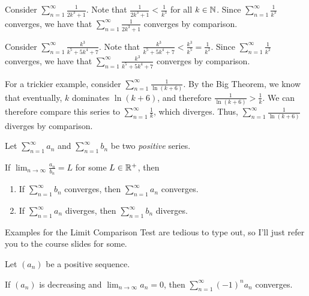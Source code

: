 \documentclass{article}
\begin{document}
    {

    \everymath{\displaystyle}
      \begin{eg}
        Consider \(\sum_{n=1}^{\infty}\frac{1}{2k^3+1}\). Note that \(\frac{1}{2k^3+1} < \frac{1}{k^3}\) for all \(k \in \mathbb{N}\). Since \(\sum_{n=1}^{\infty}\frac{1}{k^3}\) converges, we have that \(\sum_{n=1}^{\infty}\frac{1}{2k^3+1}\) converges by comparison.
      \end{eg}

      \begin{eg}
        Consider \(\sum_{n=1}^{\infty}\frac{k^3}{k^5+5k^4+7}\). Note that \(\frac{k^3}{k^5+5k^4+7} < \frac{k^3}{k^5}= \frac{1}{k^2}\). Since \(\sum_{n=1}^{\infty}\frac{1}{k^2}\) converges, we have that \(\sum_{n=1}^{\infty}\frac{k^3}{k^5+5k^4+7}\) converges by comparison.
      \end{eg}

      \begin{eg}
        For a trickier example, consider \(\sum_{n=1}^{\infty}\frac{1}{\ln(k+6)}\). By the Big Theorem, we know that eventually, \(k\) dominates \(\ln(k+6)\), and therefore \(\frac{1}{\ln(k+6)} > \frac{1}{k}\). We can therefore compare this series to \(\sum_{n=1}^{\infty}\frac{1}{k}\), which diverges. Thus, \(\sum_{n=1}^{\infty}\frac{1}{\ln(k+6)}\) diverges by comparison.
      \end{eg}
    }

      
      \begin{prop}
        \everymath{\displaystyle}
        \normalfont
        Let \(\sum_{n=1}^{\infty}a_n\) and \(\sum_{n=1}^{\infty}b_n\) be two \emph{positive} series.
      
        If \(\lim_{n \to \infty}\frac{a_n}{b_n} = L\) for some \(L \in \mathbb{R}^+\), then
        \begin{enumerate}
          \item If \(\sum_{n=1}^{\infty}b_n\) converges, then \(\sum_{n=1}^{\infty}a_n\) converges.
          \item If \(\sum_{n=1}^{\infty}a_n\) diverges, then \(\sum_{n=1}^{\infty}b_n\) diverges.
          \end{enumerate}
      \end{prop}
      
      Examples for the Limit Comparison Test are tedious to type out, so I'll just refer you to the course slides for some.
      
      \begin{prop}
        \everymath{\displaystyle}
        \normalfont
        Let \((a_n)\) be a positive sequence.
      
        If \((a_n)\) is decreasing and \(\lim_{n \to \infty}a_n = 0\), then \(\sum_{n=1}^{\infty}(-1)^{n}a_n\) converges.
      \end{prop}
\end{document}
